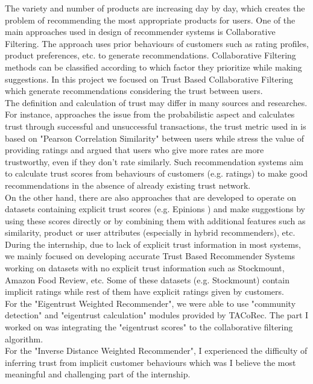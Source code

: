 The variety and number of products are increasing day by day, which creates the problem of recommending the most appropriate products for users. One of the main approaches used in design of recommender systems is Collaborative Filtering. The approach uses prior behaviours of customers such as rating profiles, product preferences, etc. to generate recommendations. Collaborative Filtering methods can be classified according to which factor they prioritize while making suggestions. In this project we focused on Trust Based Collaborative Filtering which generate recommendations considering the trust between users. \\ 

The definition and calculation of trust may differ in many sources and researches. For instance, \cite{Eigentrust} approaches the issue from the probabilistic aspect and calculates trust through successful and unsuccessful transactions, the trust metric used in \cite{papagelis_article} is based on "Pearson Correlation Similarity" between users while \cite{lathia_article} stress the value of providing ratings and argued that users who give more rates are more trustworthy, even if they don't rate similarly. Such recommendation systems aim to calculate trust scores from behaviours of customers (e.g. ratings) to make good recommendations in the absence of already existing trust network.\\

On the other hand, there are also approaches\cite{massa_article} that are developed to operate on datasets containing explicit trust scores (e.g. Epinions \cite{Epinions}) and make suggestions by using these scores directly or by combining them with additional features such as similarity, product or user attributes (especially in hybrid recommenders), etc. \\

During the internship, due  to  lack  of  explicit trust  information  in  most  systems, we mainly focused on developing accurate Trust Based Recommender Systems working on datasets with no explicit trust information such as Stockmount, Amazon Food Review, etc. Some of these datasets (e.g. Stockmount) contain implicit ratings while rest of them have explicit ratings given by customers.\\ 

For the "Eigentrust Weighted Recommender", we were able to use "community detection" and "eigentrust calculation" modules provided by TACoRec. The part I worked on was integrating the "eigentrust scores" to the collaborative filtering algorithm. \\

For the "Inverse Distance Weighted Recommender", I experienced the difficulty of inferring trust from implicit customer behaviours which was I believe the most meaningful and challenging part of the internship.
